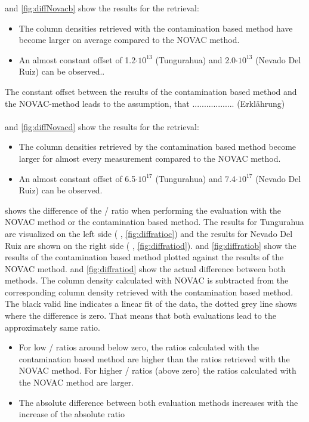 \documentclass  [
  paper    = a4,
  BCOR     = 10mm,
  twoside,
  fontsize = 12pt,
  fleqn,
  toc      = bibnumbered,
  toc      = listofnumbered,
  numbers  = noendperiod,
  headings = normal,
  listof   = leveldown,
  version  = 3.03
]                                       {scrreprt}
\begin{document}
	 and \ref{fig:diffNovacb} show the results for the   retrieval:
	\begin{itemize}
		\item The   column densities retrieved with the contamination based method have become larger on average compared to the NOVAC method.
		\item An almost constant offset of 1.2$\cdot 10 ^{13}$ (Tungurahua) and 2.0$\cdot 10 ^{13}$ (Nevado Del Ruiz) can be observed..
	\end{itemize}
	The constant offset between the results of the contamination based method and the NOVAC-method leads to the assumption, that .................. (Erklährung)\\
	\\ 
	  and \ref{fig:diffNovacd} show the results for the   retrieval:
	\begin{itemize}
		\item The   column densities retrieved by the contamination based method become larger for almost every measurement compared to the NOVAC method.
		\item An almost constant offset of 6.5$\cdot 10 ^{17}$ (Tungurahua) and 7.4$\cdot 10 ^{17}$ (Nevado Del Ruiz) can be observed.
	\end{itemize}
 shows the difference of the  /  ratio when performing the evaluation with the NOVAC method or the contamination based method. The results for Tungurahua are visualized on the left side ( , \ref{fig:diffratioc}) and the results for Nevado Del Ruiz are shown on the right side  ( , \ref{fig:diffratiod}).  and \ref{fig:diffratiob} show the results of the contamination based method plotted against the results of the NOVAC method.   and \ref{fig:diffratiod} show the actual difference between both methods. The column density calculated with NOVAC is subtracted from the corresponding column density retrieved with the contamination based method. The black valid line indicates a linear fit of the data, the dotted grey line shows where the difference is zero. That means that both evaluations lead to the approximately same ratio.\\
\begin{itemize}
	\item For low /  ratios around below zero, the ratios calculated with the contamination based method are higher than the ratios retrieved with the NOVAC method. For higher /  ratios (above zero) the ratios calculated with the NOVAC method are larger.
	\item The absolute difference between both evaluation methods increases with the increase of the absolute ratio
\end{itemize}
\end{document}
